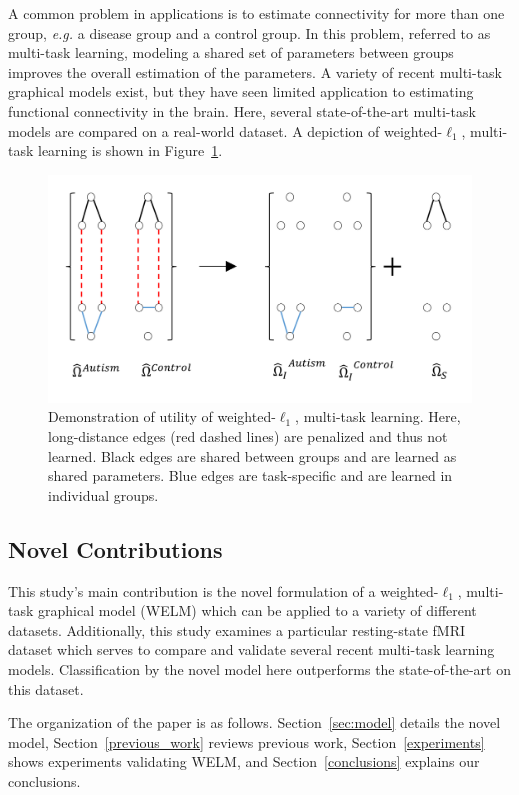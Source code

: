 \documentclass{article}
\begin{document}
A common problem in applications is to estimate connectivity for more than one group, \textit{e.g.} a disease group and a control group. In this problem, referred to as multi-task learning, modeling a shared set of parameters between groups improves the overall estimation of the parameters. A variety of recent multi-task graphical models exist, but they have seen limited application to estimating functional connectivity in the brain. Here, several state-of-the-art multi-task models are compared on a real-world dataset. A depiction of weighted-$\ell_1$, multi-task learning is shown in Figure~\ref{fig:intro}.

\begin{figure}[H]
	\centering
	\includegraphics[width=\columnwidth]{../../plots/intro/intro.png}
	\caption{Demonstration of utility of weighted-$\ell_1$, multi-task learning. Here, long-distance edges (red dashed lines) are penalized and thus not learned. Black edges are shared between groups and are learned as shared parameters. Blue edges are task-specific and are learned in individual groups.}
	\label{fig:intro}
\end{figure}

\subsection{Novel Contributions}
This study's main contribution is the novel formulation of a weighted-$\ell_1$, multi-task graphical model (WELM) which can be applied to a variety of different datasets. Additionally, this study examines a particular resting-state fMRI dataset which serves to compare and validate several recent multi-task learning models. Classification by the novel model here outperforms the state-of-the-art on this dataset.

The organization of the paper is as follows. Section~\ref{sec:model} details the novel model, Section~\ref{previous_work} reviews previous work, Section~\ref{experiments} shows experiments validating WELM, and Section~\ref{conclusions} explains our conclusions.
\end{document}
